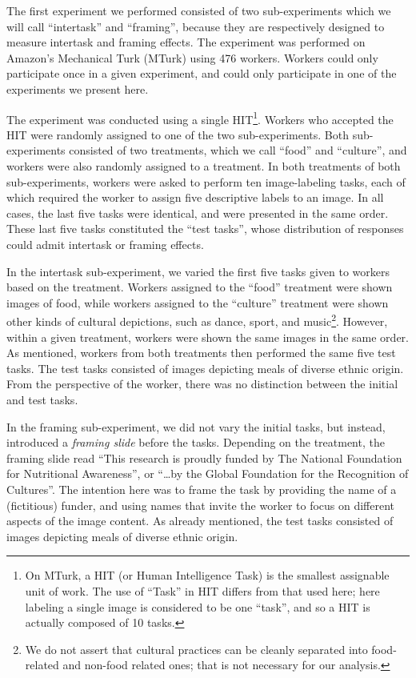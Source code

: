 \documentclass{sigchi}
\begin{document}
The first experiment we performed consisted of two sub-experiments which
we will call ``intertask'' and ``framing'', because they are respectively
designed to measure intertask and framing effects.  The experiment was 
performed on Amazon's Mechanical Turk (MTurk) using 476 workers.  Workers
could only participate once in a given experiment, and could only 
participate in one of the experiments we present here.

The experiment was conducted using a single HIT\footnote{
  On MTurk, a HIT (or Human Intelligence Task) is the smallest 
  assignable unit of work.  The use of ``Task'' in HIT differs from that
  used here; here labeling a single image is considered to be one ``task'',
  and so a HIT is actually composed of 10 tasks.
}.  Workers who accepted the HIT were randomly assigned to one of the two
sub-experiments.  Both sub-experiments consisted of two treatments, which
we call ``food'' and ``culture'', and workers were also randomly 
assigned to a treatment.  In both treatments of both sub-experiments,
workers were asked to perform ten image-labeling tasks, each of which 
required the worker to assign five descriptive labels to an image.  
In all cases, the last five tasks were 
identical, and were presented in the same order.  
These last five tasks constituted the ``test tasks'', whose distribution
of responses could admit intertask or framing effects.

In the intertask sub-experiment, we varied the first five tasks given to 
workers based on the treatment.  Workers assigned to the ``food'' 
treatment were shown images of food, while workers assigned to the 
``culture'' treatment were shown other kinds of cultural depictions, such
as dance, sport, and music\footnote{We do not assert that cultural 
practices can be cleanly separated into food-related and non-food related 
ones; that is not necessary for our analysis.}.  
However, within a given treatment, workers were shown the same images in
the same order.  As mentioned, workers 
from both treatments then performed the same five test tasks.  The test
tasks consisted of images depicting meals of diverse ethnic origin.
From the perspective of the worker, there was no distinction between the 
initial and test tasks.

In the framing sub-experiment, we did not vary the initial tasks, but 
instead, introduced a \textit{framing slide} before the tasks.  
Depending on the treatment, the framing slide read 
``This research is proudly funded by The National Foundation for 
Nutritional Awareness'', or ``\ldots by the Global Foundation for the 
Recognition of Cultures''.  The intention here was to frame the task by
providing the name of a (fictitious) funder, and using names that
invite the worker to focus on different aspects of the image content.  
As already mentioned, the test tasks consisted of images depicting meals 
of diverse ethnic origin.
\end{document}
